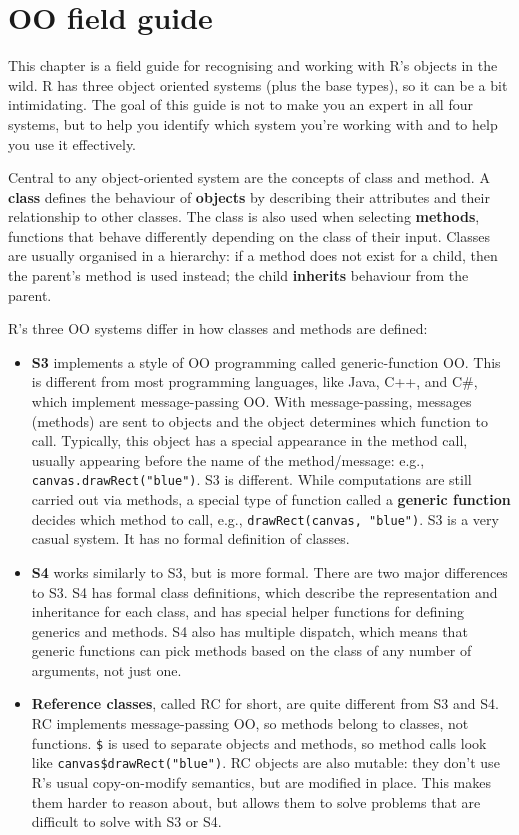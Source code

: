 \hypertarget{oo}{%
\chapter{OO field guide}\label{oo}}

This chapter is a field guide for recognising and working with R's
objects in the wild. R has three object oriented systems (plus the base
types), so it can be a bit intimidating. The goal of this guide is not
to make you an expert in all four systems, but to help you identify
which system you're working with and to help you use it effectively.

Central to any object-oriented system are the concepts of class and
method. A \textbf{class} defines the behaviour of \textbf{objects} by
describing their attributes and their relationship to other classes. The
class is also used when selecting \textbf{methods}, functions that
behave differently depending on the class of their input. Classes are
usually organised in a hierarchy: if a method does not exist for a
child, then the parent's method is used instead; the child
\textbf{inherits} behaviour from the parent.

R's three OO systems differ in how classes and methods are defined:

\begin{itemize}
\item
  \textbf{S3} implements a style of OO programming called
  generic-function OO. This is different from most programming
  languages, like Java, C++, and C\#, which implement message-passing
  OO. With message-passing, messages (methods) are sent to objects and
  the object determines which function to call. Typically, this object
  has a special appearance in the method call, usually appearing before
  the name of the method/message: e.g.,
  \texttt{canvas.drawRect("blue")}. S3 is different. While computations
  are still carried out via methods, a special type of function called a
  \textbf{generic function} decides which method to call, e.g.,
  \texttt{drawRect(canvas,\ "blue")}. S3 is a very casual system. It has
  no formal definition of classes.
\item
  \textbf{S4} works similarly to S3, but is more formal. There are two
  major differences to S3. S4 has formal class definitions, which
  describe the representation and inheritance for each class, and has
  special helper functions for defining generics and methods. S4 also
  has multiple dispatch, which means that generic functions can pick
  methods based on the class of any number of arguments, not just one.
\item
  \textbf{Reference classes}, called RC for short, are quite different
  from S3 and S4. RC implements message-passing OO, so methods belong to
  classes, not functions. \texttt{\$} is used to separate objects and
  methods, so method calls look like \texttt{canvas\$drawRect("blue")}.
  RC objects are also mutable: they don't use R's usual copy-on-modify
  semantics, but are modified in place. This makes them harder to reason
  about, but allows them to solve problems that are difficult to solve
  with S3 or S4.
\end{itemize}

